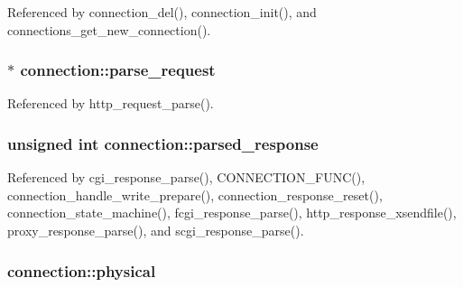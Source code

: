 Referenced by connection\-\_\-del(), connection\-\_\-init(), and connections\-\_\-get\-\_\-new\-\_\-connection().

\hypertarget{structconnection_a9f90ff4eab33e4bf140d0386165fbe87}{
\subsubsection[{parse\-\_\-request}]{$\ast$ connection\-::parse\-\_\-request}}\label{structconnection_a9f90ff4eab33e4bf140d0386165fbe87}


Referenced by http\-\_\-request\-\_\-parse().

\hypertarget{structconnection_a24f4cb581343ebeb71a06bccf3eaa98d}{
\subsubsection[{parsed\-\_\-response}]{\setlength{\rightskip}{0pt plus 5cm}unsigned int connection\-::parsed\-\_\-response}}\label{structconnection_a24f4cb581343ebeb71a06bccf3eaa98d}


Referenced by cgi\-\_\-response\-\_\-parse(), C\-O\-N\-N\-E\-C\-T\-I\-O\-N\-\_\-\-F\-U\-N\-C(), connection\-\_\-handle\-\_\-write\-\_\-prepare(), connection\-\_\-response\-\_\-reset(), connection\-\_\-state\-\_\-machine(), fcgi\-\_\-response\-\_\-parse(), http\-\_\-response\-\_\-xsendfile(), proxy\-\_\-response\-\_\-parse(), and scgi\-\_\-response\-\_\-parse().

\hypertarget{structconnection_acd39e26d871845fac20b85ef5e3823ef}{
\subsubsection[{physical}]{ connection\-::physical}}\label{structconnection_acd39e26d871845fac20b85ef5e3823ef}


